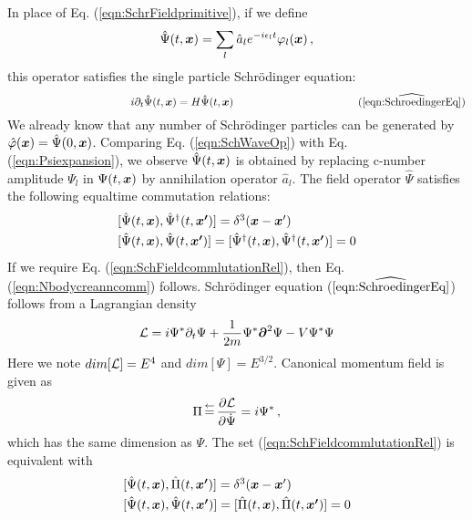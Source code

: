 In place of Eq. (\ref{eqn:SchrFieldprimitive}), if we define
\begin{equation}
\hat{\Psi}(t, \mbox{\boldmath $x$}) = \sum_l \hat{a}_l e^{-i \epsilon_l t}\varphi_l (\mbox{\boldmath $x$})\,,
\label{eqn:SchWaveOp}
\end{equation}
this operator satisfies the single particle Schr\"odinger equation:
\begin{equation*}
\hspace{40mm}
i \partial_t \hat{\Psi}(t, \bld{x}) = {H} \hat{\Psi}(t, \bld{x}) \,
\hspace{40mm}
(\widehat{\ref{eqn:SchroedingerEq}})
\end{equation*}
We already know that any number of Schr\"odinger particles can be
generated by $\hat{\varphi}(\mbox{\boldmath $x$}) = \hat{\Psi}(0, \mbox{\boldmath $x$})$.
Comparing Eq. (\ref{eqn:SchWaveOp}) with
Eq. (\ref{eqn:Psiexpansion}), we observe 
$\hat{\Psi}(t, \mbox{\boldmath $x$})$ is obtained by replacing 
c-number amplitude $\Psi_l$ in ${\Psi}(t, \mbox{\boldmath $x$})$
by annihilation operator $\hat{a}_l$.
The field operator  $\hat{\Psi}$ satisfies the following
equaltime commutation relations:
\begin{equation}
\begin{array}{l}
[\hat{\Psi}(t, \bld{x}), \hat{\Psi}^\dagger(t, \bld{x'})]
=
\delta^3 (\bld{x} - \bld{x}')
\vspace{1mm}\\ \relax
[\hat{\Psi}(t, \bld{x}), \hat{\Psi}(t, \bld{x'}) ]
=
[\hat{\Psi}^\dagger(t, \bld{x}), \hat{\Psi}^\dagger(t, \bld{x'})]
= 0
\end{array}
\label{eqn:SchFieldcommlutationRel}
\end{equation}
If we require Eq. (\ref{eqn:SchFieldcommlutationRel}), then Eq. (\ref{eqn:Nbodycreanncomm})
follows.
Schr\"odinger equation ($\widehat{\ref{eqn:SchroedingerEq}}$) follows from a
{\cal L}agrangian density
\begin{equation}
{\cal L} = i \Psi^* \partial_t \Psi + \frac{1}{2m} \Psi^* \mbox{\boldmath $\partial$}^2 \Psi - V \Psi^* \Psi
\label{eqn:SchroedingerFieldLagrangian}
\end{equation}
Here we note $dim [{\cal L}] = E^4$ and $dim [\Psi] = E^{3/2}$.
Canonical momentum field is given as
\begin{equation}
\Pi \,\mbox{$\stackrel{\leftarrow}{=}$}\, \frac{\partial \cal L}{\partial \dot{\Psi}} = i \Psi^*\,,
\end{equation}
which has the same dimension as $\Psi$.
The set (\ref{eqn:SchFieldcommlutationRel}) is equivalent with
\begin{equation}
\begin{array}{l}
[\hat{\Psi}(t, \bld{x}), \hat{\Pi}(t, \bld{x'})]
=
\delta^3 (\bld{x} - \bld{x}')
\vspace{1mm}\\ \relax
[\hat{\Psi}(t, \bld{x}), \hat{\Psi}(t, \bld{x'}) ]
=
[\hat{\Pi}(t, \bld{x}), \hat{\Pi}(t, \bld{x'})]
= 0
\end{array}
\label{eqn:SchFieldCanonicalcommlutationRel}
\end{equation}
